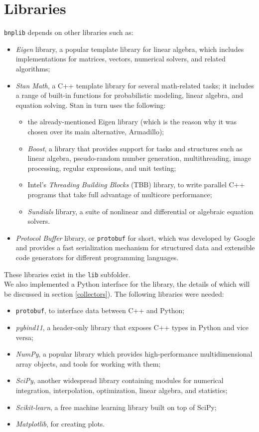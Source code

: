 \section{Libraries}
\verb|bnplib| depends on other libraries such as:
\begin{itemize}
	\item \emph{Eigen} library, a popular template library for linear algebra, which includes implementations for matrices, vectors, numerical solvers, and related algorithms;
	\item \emph{Stan Math}, a C++ template library for several math-related tasks; it includes a range of built-in functions for probabilistic modeling, linear algebra, and equation solving.
	Stan in turn uses the following:
	\begin{itemize}
		\item the already-mentioned Eigen library (which is the reason why it was chosen over its main alternative, Armadillo);
		\item \emph{Boost}, a library that provides support for tasks and structures such as linear algebra, pseudo-random number generation, multithreading, image processing, regular expressions, and unit testing;
		\item Intel's \emph{Threading Building Blocks} (TBB) library, to write parallel C++ programs that take full advantage of multicore performance;
		\item \emph{Sundials} library, a suite of nonlinear and differential or algebraic equation solvers.
	\end{itemize}
	\item \emph{Protocol Buffer} library, or \verb|protobuf| for short, which was developed by Google and provides a fast serialization mechanism for structured data and extensible code generators for different programming languages.
\end{itemize}
These libraries exist in the \verb|lib| subfolder. \\
We also implemented a Python interface for the library, the details of which will be discussed in section \ref{collectors}).
The following libraries were needed:
\begin{itemize}
	\item \verb|protobuf|, to interface data between C++ and Python;
	\item \emph{pybind11}, a header-only library that exposes C++ types in Python and vice versa;
	\item \emph{NumPy}, a popular library which provides high-performance multidimensional array objects, and tools for working with them;
	\item \emph{SciPy}, another widespread library containing modules for numerical integration, interpolation, optimization, linear algebra, and statistics;
	\item \emph{Scikit-learn}, a free machine learning library built on top of SciPy;
	\item \emph{Matplotlib}, for creating plots.
\end{itemize}

